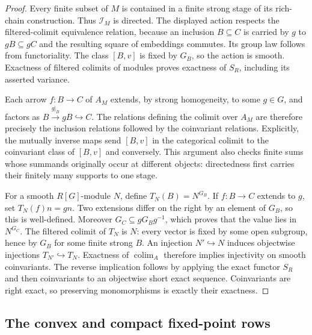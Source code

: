 \begin{proof}
Every finite subset of $M$ is contained in a finite strong stage of its
rich-chain construction. Thus $\mathcal I_M$ is directed. The displayed
action respects the filtered-colimit equivalence relation, because an
inclusion $B\subseteq C$ is carried by $g$ to $gB\subseteq gC$ and the
resulting square of embeddings commutes. Its group law follows from
functoriality. The class $[B,v]$ is fixed by $G_B$, so the action is
smooth. Exactness of filtered colimits of modules proves exactness of
$S_R$, including its asserted variance.

Each arrow $f:B\to C$ of $A_M$ extends, by strong homogeneity, to some
$g\in G$, and factors as $B\xrightarrow{g|_B}gB\hookrightarrow C$.
The relations defining the colimit over $A_M$ are therefore precisely
the inclusion relations followed by the coinvariant relations.
Explicitly, the mutually inverse maps send $[B,v]$ in the categorical
colimit to the coinvariant class of $[B,v]$ and conversely. This argument
also checks finite sums whose summands originally occur at different
objects: directedness first carries their finitely many supports to
one stage.

For a smooth $R[G]$-module $N$, define $T_N(B)=N^{G_B}$. If
$f:B\to C$ extends to $g$, set $T_N(f)n=gn$. Two extensions differ on
the right by an element of $G_B$, so this is well-defined. Moreover
$G_C\subseteq gG_Bg^{-1}$, which proves that the value lies in
$N^{G_C}$. The filtered colimit of $T_N$ is $N$: every vector is fixed
by some open subgroup, hence by $G_B$ for some finite strong $B$.
An injection $N'\hookrightarrow N$ induces objectwise injections
$T_{N'}\hookrightarrow T_N$. Exactness of $\operatorname{colim}_A$
therefore implies injectivity on smooth coinvariants. The reverse
implication follows by applying the exact functor $S_R$ and then
coinvariants to an objectwise short exact sequence. Coinvariants are
right exact, so preserving monomorphisms is exactly their exactness.
\end{proof}



\subsection{The convex and compact fixed-point rows}


